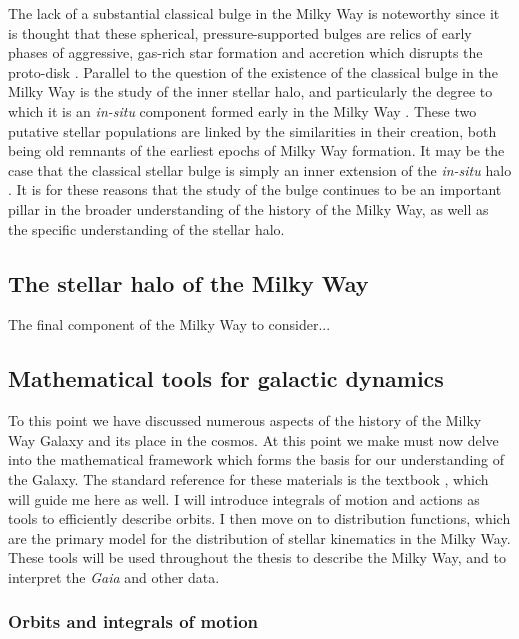 The lack of a substantial classical bulge in the Milky Way is noteworthy since it is thought that these spherical, pressure-supported bulges are relics of early phases of aggressive, gas-rich star formation and accretion which disrupts the proto-disk \parencite{steinmetz95,samland03,obreja13}. Parallel to the question of the existence of the classical bulge in the Milky Way is the study of the inner stellar halo, and particularly the degree to which it is an \textit{in-situ} component formed early in the Milky Way \parencite[e.g.][]{rix22}. These two putative stellar populations are linked by the similarities in their creation, both being old remnants of the earliest epochs of Milky Way formation. It may be the case that the classical stellar bulge is simply an inner extension of the \textit{in-situ} halo \parencite{perez-villegas17}. It is for these reasons that the study of the bulge continues to be an important pillar in the broader understanding of the history of the Milky Way, as well as the specific understanding of the stellar halo.


\subsection{The stellar halo of the Milky Way}

The final component of the Milky Way to consider...

\subsection{Mathematical tools for galactic dynamics}

To this point we have discussed numerous aspects of the history of the Milky Way Galaxy and its place in the cosmos. At this point we make must now delve into the mathematical framework which forms the basis for our understanding of the Galaxy. The standard reference for these materials is the textbook \textcite{binney08}, which will guide me here as well. I will introduce integrals of motion and actions as tools to efficiently describe orbits. I then move on to distribution functions, which are the primary model for the distribution of stellar kinematics in the Milky Way. These tools will be used throughout the thesis to describe the Milky Way, and to interpret the \textit{Gaia} and other data.

\subsubsection{Orbits and integrals of motion}

